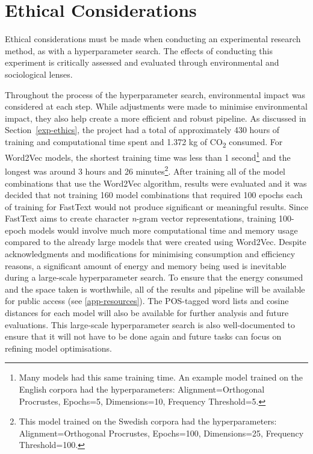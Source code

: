 \section{Ethical Considerations}
\label{sec:ethicalcons}

Ethical considerations must be made when conducting an experimental research method, as with a hyperparameter search. The effects of conducting this experiment is critically assessed and evaluated through environmental and sociological lenses.

Throughout the process of the hyperparameter search, environmental impact was considered at each step. While adjustments were made to minimise environmental impact, they also help create a more efficient and robust pipeline. As discussed in Section~\ref{exp-ethics}, the project had a total of approximately 430 hours of training and computational time spent and 1.372 kg of CO\textsubscript{2} consumed. For Word2Vec models, the shortest training time was less than 1 second\footnote{Many models had this same training time. An example model trained on the English corpora had the hyperparameters: Alignment=Orthogonal Procrustes, Epochs=5, Dimensions=10, Frequency Threshold=5.} and the longest was around 3 hours and 26 minutes\footnote{This model trained on the Swedish corpora had the hyperparameters: Alignment=Orthogonal Procrustes, Epochs=100, Dimensions=25, Frequency Threshold=100.}. After training all of the model combinations that use the Word2Vec algorithm, results were evaluated and it was decided that not training 160 model combinations that required 100 epochs each of training for FastText would not produce significant or meaningful results. Since FastText aims to create character \emph{n}-gram vector representations, training 100-epoch models would involve much more computational time and memory usage compared to the already large models that were created using Word2Vec. Despite acknowledgments and modifications for minimising consumption and efficiency reasons, a significant amount of energy and memory being used is inevitable during a large-scale hyperparameter search. To ensure that the energy consumed and the space taken is worthwhile, all of the results and pipeline will be available for public access (see \autoref{app-resources}). The POS-tagged word lists and cosine distances for each model will also be available for further analysis and future evaluations. This large-scale hyperparameter search is also well-documented to ensure that it will not have to be done again and future tasks can focus on refining model optimisations. 

